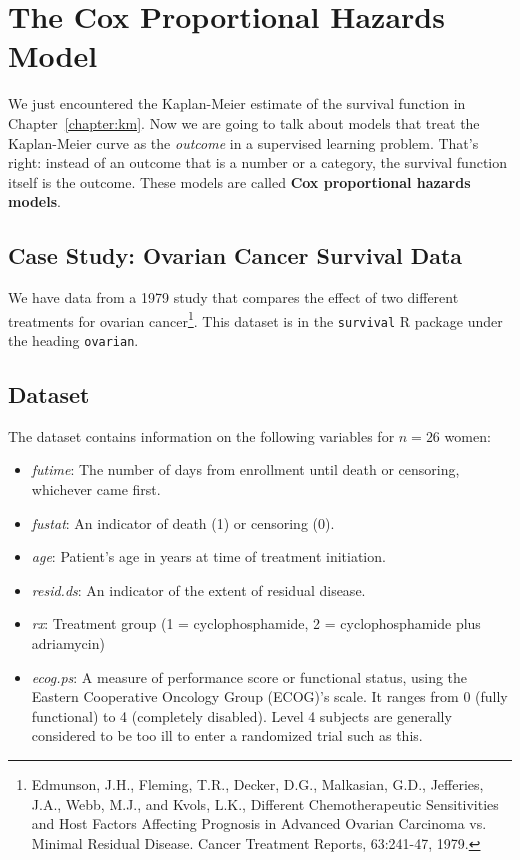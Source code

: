 \chapter{The Cox Proportional Hazards Model \label{chapter:cox}}

We just encountered the Kaplan-Meier estimate of the survival function in Chapter~\ref{chapter:km}. Now we are going to talk about models that treat the Kaplan-Meier curve as the \emph{outcome} in a supervised learning problem. That's right: instead of an outcome that is a number or a category, the survival function itself is the outcome. These models are called \textbf{Cox proportional hazards models}.

\section{Case Study: Ovarian Cancer Survival Data}

We have data from a 1979 study that compares the effect of two different treatments for ovarian cancer\footnote{Edmunson, J.H., Fleming, T.R., Decker, D.G., Malkasian, G.D., Jefferies, J.A., Webb, M.J., and Kvols, L.K., Different Chemotherapeutic Sensitivities and Host Factors Affecting Prognosis in Advanced Ovarian Carcinoma vs. Minimal Residual Disease. Cancer Treatment Reports, 63:241-47, 1979.}. This dataset is in the \texttt{survival} R package under the heading \texttt{ovarian}. 

\section{Dataset}

The dataset contains information on the following variables for $n=26$ women:

\begin{itemize}
\item \emph{futime}: The number of days from enrollment until death or censoring, whichever came first.
\item \emph{fustat}: An indicator of death (1) or censoring (0).
\item \emph{age}: Patient's age in years at time of treatment initiation. 
\item \emph{resid.ds}: An indicator of the extent of residual disease.
\item \emph{rx}: Treatment group (1 = cyclophosphamide, 2 = cyclophosphamide plus adriamycin)
\item \emph{ecog.ps}: A measure of performance score or functional status, using the Eastern Cooperative Oncology Group (ECOG)'s scale. It ranges from 0 (fully functional) to 4 (completely disabled). Level 4 subjects are generally considered to be too ill to enter a randomized trial such as this.
\end{itemize}

